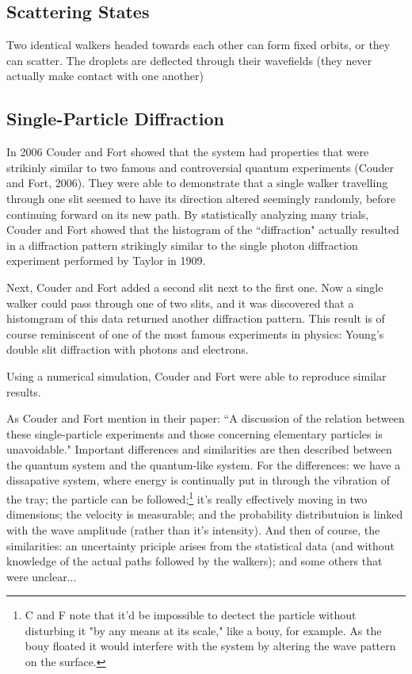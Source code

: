             \subsection{Scattering States}
            Two identical walkers headed towards each other can form fixed orbits, or they can scatter. The droplets are deflected through their wavefields (they never actually make contact with one another)            
            \subsection{Single-Particle Diffraction}
In 2006 Couder and Fort showed that the system had properties that were strikinly similar to two famous and controversial quantum experiments (Couder and Fort, 2006). They were able to demonstrate that a single walker travelling through one slit seemed to have its direction altered seemingly randomly, before continuing forward on its new path. By statistically analyzing many trials, Couder and Fort showed that the histogram of the ``diffraction" actually resulted in a diffraction pattern strikingly similar to the single photon diffraction experiment performed by Taylor in 1909. 

Next, Couder and Fort added a second slit next to the first one. Now a single walker could pass through  one of two slits, and it was discovered that a histomgram of this data returned another diffraction pattern. This result is of course reminiscent of one of the most famous experiments in physics: Young's double slit diffraction with photons and electrons. 
    
Using a numerical simulation, Couder and Fort were able to reproduce similar results. 
    
As Couder and Fort mention in their paper: ``A discussion of the relation between these single-particle experiments and those concerning elementary particles is unavoidable." Important differences and similarities are then described between the quantum system and the quantum-like system. For the differences: we have a dissapative system, where energy is continually put in through the vibration of the tray; the particle can be followed;\footnote{C and F note that it'd be impossible to dectect the particle without disturbing it "by any means at its scale," like a bouy, for example. As the bouy floated it would interfere with the system by altering the wave pattern on the surface.} it's really effectively moving in two dimensions; the velocity is measurable; and the probability distributuion is linked with the wave amplitude (rather than it's intensity). And then of course, the similarities: an uncertainty priciple arises from the statistical data (and without knowledge of the actual paths followed by the walkers); and some others that were unclear...


